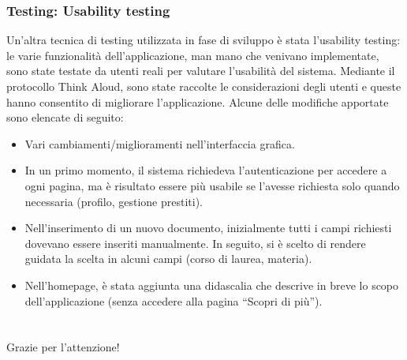 \documentclass{beamer}
\begin{document}
\begin{frame}
\frametitle{Testing: Usability testing}
Un'altra tecnica di testing utilizzata in fase di sviluppo è stata l'usability testing: le varie funzionalità dell'applicazione, man mano che venivano implementate, sono state testate da utenti reali per valutare l'usabilità del sistema. Mediante il protocollo Think Aloud, sono state raccolte le considerazioni degli utenti e queste hanno consentito di migliorare l'applicazione. Alcune delle modifiche apportate sono elencate di seguito:
\begin{itemize}
\item Vari cambiamenti/miglioramenti nell'interfaccia grafica.
\item In un primo momento, il sistema richiedeva l'autenticazione per accedere a ogni pagina, ma è risultato essere più usabile se l'avesse richiesta solo quando necessaria (profilo, gestione prestiti).
\item Nell'inserimento di un nuovo documento, inizialmente tutti i campi richiesti dovevano essere inseriti manualmente. In seguito, si è scelto di rendere guidata la scelta in alcuni campi (corso di laurea, materia).
\item Nell'homepage, è stata aggiunta una didascalia che descrive in breve lo scopo dell'applicazione (senza accedere alla pagina “Scopri di più”).
\end{itemize}
\end{frame}

\section{}

\begin{frame}
\Huge{\centerline{Grazie per l'attenzione!}}
\end{frame}

\end{document}
